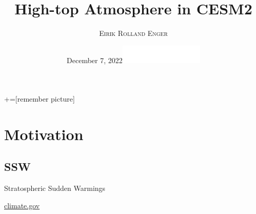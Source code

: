 \documentclass[xcolor=dvipsnames]{beamer} %
\title[High-top Atmosphere in CESM2]{High-top Atmosphere in CESM2}
\author{\textsc{Eirik Rolland Enger}}
\date{\vspace{-3mm}December 7, 2022\hfill\includegraphics[width=4cm]{utils/CSU-Official-wrdmrk-Rev-2.png}}
\begin{document}
\maketitle

+=[remember picture]
\everymath{\displaystyle}

\section{Motivation}

\subsection{SSW}
\begin{frame}{Stratospheric Sudden Warmings}
  \begin{center}
    {\tiny\href{https://www.climate.gov/news-features/blogs/enso/polar-vortex-going-make-you-put-sweater-be-afraid-be-very-afraid\#:~:text=Thus\%2C\%20the\%20tropospheric\%20polar\%20vortex,that\%20separates\%20the\%20air\%20masses.}{climate.gov}}
  \end{center}
\end{frame}
\end{document}
